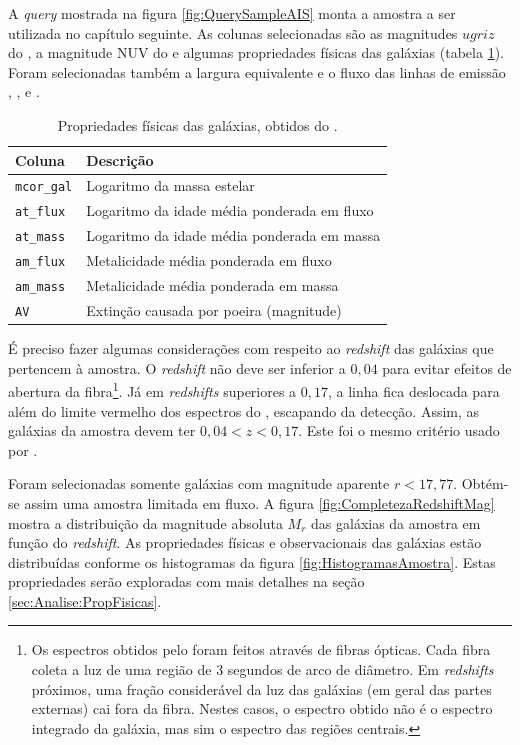 A {\em query} mostrada na figura \ref{fig:QuerySampleAIS} monta a amostra a ser
utilizada no capítulo seguinte. As colunas selecionadas são as magnitudes
$ugriz$ do \SDSS, a magnitude NUV do \galex e algumas propriedades físicas das
galáxias (tabela \ref{tab:ParamFisicos}). Foram selecionadas também a largura
equivalente e o fluxo das linhas de emissão \Halpha, \Hbeta, \OIII e \NII.

\begin{table}
	\caption[Propriedades físicas das galáxias utilizados na amostra.]
	{Propriedades físicas das galáxias, obtidos do \starlight.}
	\begin{tabular}{l l}
		Coluna & Descrição \\
		\midrule
		\texttt{mcor\_gal} & Logaritmo da massa estelar \\
		\texttt{at\_flux}  & Logaritmo da idade média ponderada em fluxo \\
		\texttt{at\_mass}  & Logaritmo da idade média ponderada em massa \\
		\texttt{am\_flux}  & Metalicidade média ponderada em fluxo \\
		\texttt{am\_mass}  & Metalicidade média ponderada em massa \\
		\texttt{AV}        & Extinção causada por poeira (magnitude) \\
	\end{tabular}
	\label{tab:ParamFisicos}
\end{table}

É preciso fazer algumas  considerações com respeito ao {\em redshift} das
galáxias que pertencem à amostra. O {\em redshift} não deve ser inferior a
$0,04$ para evitar efeitos de abertura da fibra\footnote{Os espectros obtidos
pelo \SDSS foram feitos através de fibras ópticas. Cada fibra coleta a luz de
uma região de 3 segundos de arco de diâmetro. Em {\em redshifts} próximos, uma
fração considerável da luz das galáxias (em geral das partes externas) cai fora
da fibra. Nestes casos, o espectro obtido não é o espectro integrado da galáxia,
mas sim o espectro das regiões centrais.}. Já em {\em redshifts} superiores a
$0,17$, a linha \NII fica deslocada para além do limite vermelho dos espectros
do \SDSS, escapando da detecção. Assim, as galáxias da amostra devem ter $0,04 <
z < 0,17$. Este foi o mesmo critério usado por \citet{CidFernandes2011}.

Foram selecionadas somente galáxias com magnitude aparente $r<17,77$. Obtém-se
assim uma amostra limitada em fluxo. A figura \ref{fig:CompletezaRedshiftMag}
mostra a distribuição da magnitude absoluta $M_r$ das galáxias da amostra em
função do {\em redshift}. As propriedades físicas e observacionais das galáxias
estão distribuídas conforme os histogramas da figura
\ref{fig:HistogramasAmostra}. Estas propriedades serão exploradas com mais
detalhes na seção \ref{sec:Analise:PropFisicas}.

